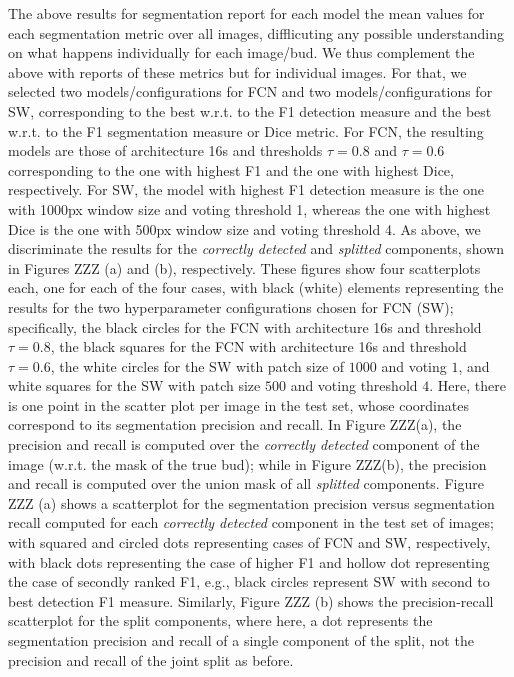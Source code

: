 \documentclass[a4paper,authoryear,review]{elsarticle}
\begin{document}
The above results for segmentation report for each model the mean values for each segmentation metric over all images, difflicuting any possible understanding on what happens individually for each image/bud. We thus complement the above with reports of these metrics but for individual images. For that, we selected two models/configurations for FCN and two models/configurations for SW, corresponding to the best w.r.t. to the F1 detection measure and the best w.r.t. to the F1 segmentation measure or Dice metric. For FCN, the resulting models are those of architecture 16s and thresholds $\tau=0.8$ and $\tau=0.6$ corresponding to the one with highest F1 and the one with highest Dice, respectively. For SW, the model with highest F1 detection measure is the one with 1000px window size and voting threshold 1, whereas the one with highest Dice is the one with 500px window size and voting threshold 4. 
As above, we discriminate the results for the \emph{correctly detected} and \emph{splitted} components, shown in Figures ZZZ (a) and (b),  respectively. These figures show four scatterplots each, one for each of the four cases, with black (white) elements representing the results for the two hyperparameter configurations chosen for FCN (SW); specifically, the black circles for the FCN with architecture 16s and threshold $\tau=0.8$,  the black squares for the  FCN with architecture 16s and threshold $\tau=0.6$, the white circles for the SW with patch size of $1000$ and voting $1$, and white squares for the SW with patch size $500$ and voting threshold $4$. Here, there is one point in the scatter plot per image in the test set, whose coordinates correspond to its segmentation precision and recall. In Figure ZZZ(a), the precision and recall is computed over the \emph{correctly detected} component of the image (w.r.t. the mask of the true bud); while in Figure ZZZ(b),  the precision and recall is computed over the union mask of all \emph{splitted} components.
Figure ZZZ (a) shows a scatterplot for the segmentation precision versus segmentation recall computed for each \emph{correctly detected} component in the test set of images; with squared and circled dots representing cases of FCN and SW, respectively, with black dots representing the case of higher F1 and hollow dot representing the case of secondly ranked F1, e.g., black circles represent SW with second to best detection F1 measure. Similarly, Figure ZZZ (b)  shows the precision-recall scatterplot for the split components, where here, a dot represents the segmentation precision and recall of a single component of the split, not the precision and recall of the joint split as before. 
\end{document}
